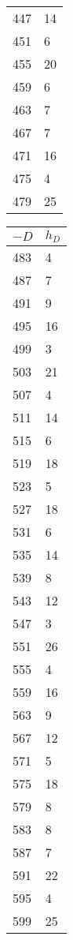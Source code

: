 \documentclass[11pt]{report}
\begin{document}
\begin{center}
\begin{tabular}{|ll|}
    447  & 14      \\
    451  & 6       \\
    455  & 20      \\
    459  & 6       \\
    463  & 7       \\
    467  & 7       \\
    471  & 16      \\
    475  & 4       \\
    479  & 25      \\\hline
  \end{tabular}
  \begin{tabular}{|ll|}\hline
    $-D$ & $h_{D}$ \\\hline
    483  & 4       \\
    487  & 7       \\
    491  & 9       \\
    495  & 16      \\
    499  & 3       \\
    503  & 21      \\
    507  & 4       \\
    511  & 14      \\
    515  & 6       \\
    519  & 18      \\
    523  & 5       \\
    527  & 18      \\
    531  & 6       \\
    535  & 14      \\
    539  & 8       \\
    543  & 12      \\
    547  & 3       \\
    551  & 26      \\
    555  & 4       \\
    559  & 16      \\
    563  & 9       \\
    567  & 12      \\
    571  & 5       \\
    575  & 18      \\
    579  & 8       \\
    583  & 8       \\
    587  & 7       \\
    591  & 22      \\
    595  & 4       \\
    599  & 25      \\\hline

\end{tabular}
\end{center}
\end{document}
